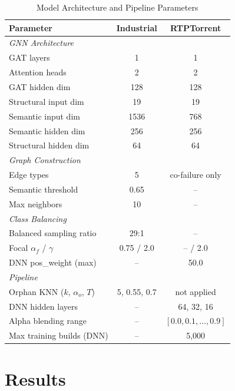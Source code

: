 \documentclass[10pt,journal,compsoc]{IEEEtran}
\begin{document}
\begin{table}[!t]
\centering
\caption{Model Architecture and Pipeline Parameters}
\label{tab:arch_params}
\footnotesize
\begin{tabular}{lcc}
\toprule
\textbf{Parameter} & \textbf{Industrial} & \textbf{RTPTorrent} \\
\midrule
\multicolumn{3}{l}{\textit{GNN Architecture}} \\
GAT layers & 1 & 1 \\
Attention heads & 2 & 2 \\
GAT hidden dim & 128 & 128 \\
Structural input dim & 19 & 19 \\
Semantic input dim & 1536 & 768 \\
Semantic hidden dim & 256 & 256 \\
Structural hidden dim & 64 & 64 \\
\midrule
\multicolumn{3}{l}{\textit{Graph Construction}} \\
Edge types & 5 & co-failure only \\
Semantic threshold & 0.65 & -- \\
Max neighbors & 10 & -- \\
\midrule
\multicolumn{3}{l}{\textit{Class Balancing}} \\
Balanced sampling ratio & 29:1 & -- \\
Focal $\alpha_f$ / $\gamma$ & 0.75 / 2.0 & -- / 2.0 \\
DNN pos\_weight (max) & -- & 50.0 \\
\midrule
\multicolumn{3}{l}{\textit{Pipeline}} \\
Orphan KNN ($k$, $\alpha_o$, $T$) & 5, 0.55, 0.7 & not applied \\
DNN hidden layers & -- & 64, 32, 16 \\
Alpha blending range & -- & $[0.0, 0.1, \ldots, 0.9]$ \\
Max training builds (DNN) & -- & 5,000 \\
\bottomrule
\end{tabular}
\end{table}

\section{Results}
\label{sec:results}
\end{document}
